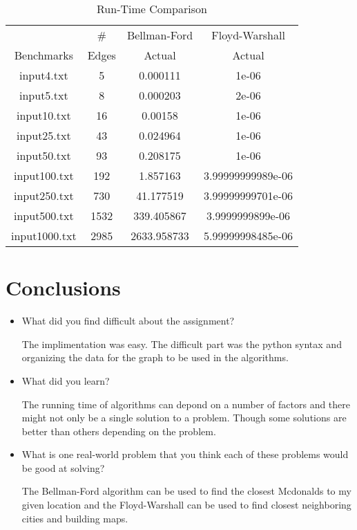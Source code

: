 \documentclass[twocolumn]{article}
\begin{document}
\begin{table}
    \caption{Run-Time Comparison}
    \begin{tabular}{|c|c|c|c|}
        \hline
        &\#&Bellman-Ford&Floyd-Warshall\\
        Benchmarks &Edges&Actual&Actual\\
        \hline
        input4.txt   &   5& 0.000111& 1e-06 \\
        input5.txt   &   8& 0.000203& 2e-06 \\
        input10.txt  &  16& 0.00158&  1e-06 \\
        input25.txt  &  43& 0.024964& 1e-06 \\
        input50.txt  &  93& 0.208175&  1e-06 \\
        input100.txt & 192& 1.857163& 3.99999999989e-06 \\
        input250.txt & 730& 41.177519& 3.99999999701e-06 \\
        input500.txt &1532& 339.405867& 3.9999999899e-06 \\
        input1000.txt&2985& 2633.958733& 5.99999998485e-06 \\
        \hline
    \end{tabular}
    \label{table::run-time}
\end{table}

\section{Conclusions}
\begin{itemize}
    \item What did you find difficult about the assignment?
    
    The implimentation was easy. The difficult part was the python syntax and organizing the data for the graph to be used in the algorithms.
    
    \item What did you learn?
    
    The running time of algorithms can depond on a number of factors and there might not only be a single solution to a problem. Though some solutions are better than others depending on the problem.
    
    \item What is one real-world problem that you think each of these problems
    would be good at solving?
    
    The Bellman-Ford algorithm can be used to find the closest Mcdonalds to my given location and the Floyd-Warshall can be used to find closest neighboring cities and building maps.
    
\end{itemize}
\end{document}
